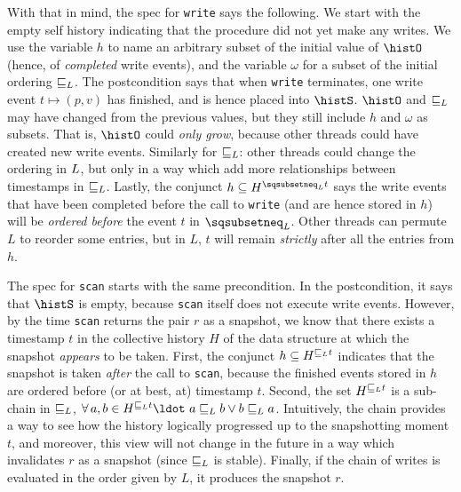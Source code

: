 With that in mind, the spec for {\tt write} says the following. We
start with the empty self history indicating that the procedure did
not yet make any writes. We use the variable $h$ to name an arbitrary
subset of the initial value of $\histO$ (hence, of \emph{completed}
write events), and the variable $\omega$ for a subset of the initial
ordering $\mathrel{\sqsubseteq_L}$. The postcondition says that when {\tt write}
terminates, one write event $t \mapsto (p, v)$ has finished, and is
hence placed into $\histS$.  $\histO$ and $\mathrel{\sqsubseteq_L}$ may have changed
from the previous values, but they still include $h$ and $\omega$ as
subsets. That is, $\histO$ could \emph{only grow}, because other
threads could have created new write events. Similarly for $\mathrel{\sqsubseteq_L}$:
other threads could change the ordering in $L$, but only in a
way which add more relationships between timestamps in
$\mathrel{\sqsubseteq_L}$. Lastly, the conjunct
$h \subseteq H^{\hbox{}\sqsubsetneq_\ordlist t}$ says the write events
that have been completed before the call to {\tt write} (and are hence
stored in $h$) will be \emph{ordered before} the event $t$ in
$\sqsubsetneq_\ordlist$. Other threads can permute $L$ to reorder some
entries, but in $L$, $t$ will remain \emph{strictly} after all the
entries from $h$.

The spec for {\tt scan} starts with the same precondition. In the
postcondition, it says that $\histS$ is empty, because {\tt scan}
itself does not execute write events. However, by the time {\tt scan}
returns the pair $r$ as a snapshot, we know that there exists a
timestamp $t$ in the collective history $H$ of the data structure at
which the snapshot \emph{appears} to be taken. First, the conjunct
$h \subseteq H^{\hbox{}\sqsubseteq_L t}$ indicates that the
snapshot is taken \emph{after} the call to {\tt scan}, because the
finished events stored in $h$ are ordered before (or at best, at)
timestamp $t$.
%
%
%
Second, the set $H^{\hbox{}\sqsubseteq_L t}$ is a sub-chain in
$\sqsubseteq_L$, \ie $\forall\, a,b \in
H^{\hbox{}\sqsubseteq_\ordlist t}\ldot\ a \sqsubseteq_{\ordlist} b
\vee b \sqsubseteq_{\ordlist} a$.
%
Intuitively, the chain provides a way to see how the history logically
progressed up to the snapshotting moment $t$, and moreover, this view
will not change in the future in a way which invalidates $r$ as a
snapshot (since $\sqsubseteq_L$ is stable). Finally, if the
chain of writes is evaluated in the order given by $L$, it produces
the snapshot $r$.

